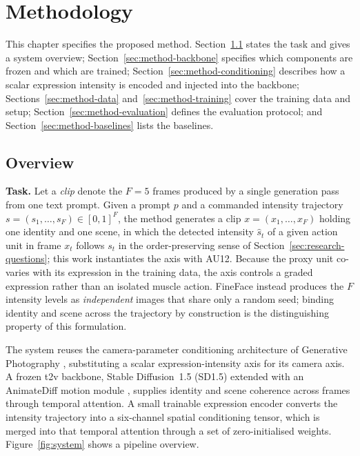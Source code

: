 \chapter{Methodology}\label{cap:method}
\glsresetall


This chapter specifies the proposed method. Section~\ref{sec:method-overview} states the
task and gives a system overview; Section~\ref{sec:method-backbone} specifies which
components are frozen and which are trained; Section~\ref{sec:method-conditioning}
describes how a scalar expression intensity is encoded and injected into the backbone;
Sections~\ref{sec:method-data} and~\ref{sec:method-training} cover the training data and
setup; Section~\ref{sec:method-evaluation} defines the evaluation protocol; and
Section~\ref{sec:method-baselines} lists the baselines.

\section{Overview}\label{sec:method-overview}

\noindent\textbf{Task.} Let a \emph{clip} denote the $F=5$ frames produced by a single
generation pass from one text prompt. Given a prompt $p$ and a commanded intensity trajectory
$s=(s_1,\dots,s_F)\in[0,1]^F$, the method generates a clip $x=(x_1,\dots,x_F)$ holding one
identity and one scene, in which the detected intensity $\hat{s}_t$ of a given action unit in
frame $x_t$ follows $s_t$ in the order-preserving sense of
Section~\ref{sec:research-questions}; this work instantiates the axis with AU12.
Because the proxy unit co-varies with its expression in the training data, the axis
controls a graded expression rather than an isolated muscle action. FineFace \citep{varanka2024fineface} instead produces the $F$ intensity levels as \emph{independent} images that share only a random seed; binding identity and scene across the trajectory by construction is the distinguishing property of this formulation.

The system reuses the camera-parameter conditioning architecture of Generative Photography
\citep{yuan2024genphoto}, substituting a scalar expression-intensity axis for
its camera axis. A frozen \gls{t2v} backbone, Stable Diffusion~1.5 (SD1.5)
\citep{rombach2022ldm} extended with an AnimateDiff motion module
\citep{guo2024animatediff}, supplies identity and scene coherence across frames through
temporal attention. A small trainable expression encoder converts the intensity
trajectory into a six-channel spatial conditioning tensor, which is merged into that
temporal attention through a set of zero-initialised weights.
Figure~\ref{fig:system} shows a pipeline overview.

